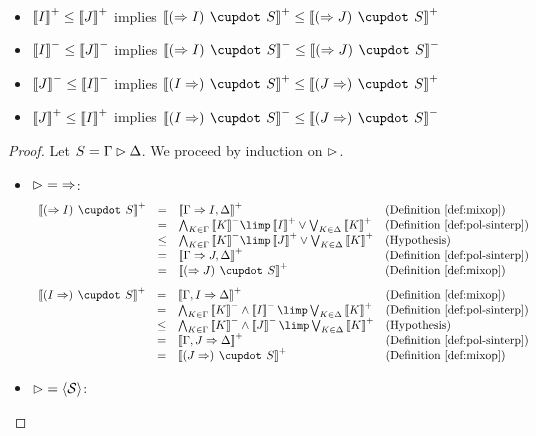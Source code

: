 \begin{lemma}[Functoriality]
  ~\\
  \begin{itemize}
    \item $\left\llbracket I \right\rrbracket^+ \leq \left\llbracket J \right\rrbracket^+$ implies $\psint{(\seq I) \mix S} \sement
    \psint{(\seq J) \mix S}$
    \item $\left\llbracket I \right\rrbracket^- \leq \left\llbracket J \right\rrbracket^-$ implies $\nsint{(\seq I) \mix S} \sement
    \nsint{(\seq J) \mix S}$
    \item $\left\llbracket J \right\rrbracket^- \leq \left\llbracket I \right\rrbracket^-$ implies $\psint{(I \seq) \mix S} \sement
    \psint{(J \seq) \mix S}$
    \item $\left\llbracket J \right\rrbracket^+ \leq \left\llbracket I \right\rrbracket^+$ implies $\nsint{(I
    \seq) \mix S} \sement \nsint{(J \seq) \mix S}$
  \end{itemize}
\end{lemma}
\begin{proof}
  Let $S = \Gamma \mathbin{\rhd} \Delta$. We proceed by induction on $\mathbin{\rhd}$.
  \begin{itemize}
    \item $\mathbin{\rhd} = {\Rightarrow}$:
    $$
    \begin{array}{rcll}
      \psint{(\seq I) \mix S}
      &=& \psint{\Gamma \seq I, \Delta} &\text{(\refdef{mixop})}\\
      &=& \bigwedge_{K \in \Gamma}{\nsint{K}} \limp \psint{I} \lor \bigvee_{K \in \Delta}{\psint{K}} &\text{(\refdef{pol-sinterp})}\\
      &\sement& \bigwedge_{K \in \Gamma}{\nsint{K}} \limp \psint{J} \lor \bigvee_{K \in \Delta}{\psint{K}} &\text{(Hypothesis)}\\
      &=& \psint{\Gamma \seq J, \Delta} &\text{(\refdef{pol-sinterp})}\\
      &=& \psint{(\seq J) \mix S} &\text{(\refdef{mixop})}
    \end{array}
    $$
    $$
    \begin{array}{rcll}
      \psint{(I \seq) \mix S}
      &=& \psint{\Gamma, I \seq \Delta} &\text{(\refdef{mixop})}\\
      &=& \bigwedge_{K \in \Gamma}{\nsint{K}} \land \nsint{I} \limp \bigvee_{K \in \Delta}{\psint{K}} &\text{(\refdef{pol-sinterp})}\\
      &\sement& \bigwedge_{K \in \Gamma}{\nsint{K}} \land \nsint{J} \limp \bigvee_{K \in \Delta}{\psint{K}} &\text{(Hypothesis)} \\
      &=& \psint{\Gamma, J \seq \Delta} &\text{(\refdef{pol-sinterp})}\\
      &=& \psint{(J \seq) \mix S} &\text{(\refdef{mixop})}
    \end{array}
    $$
    \item $\mathbin{\rhd} = {\mathbin{\langle \mathcal{S} \rangle}}$:
  \end{itemize}
\end{proof}

